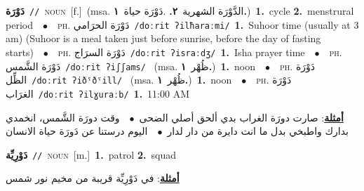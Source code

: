 \documentclass[10pt,a4paper,twoside]{article} %
\begin{document}
\begin{multicols}{2}
{\setlength\topsep{0pt}\textbf{\foreignlanguage{arabic}{دَوْرَة}}\ {\color{gray}\texttt{//}\color{black}}\ \textsc{noun}\ [f.]\ \color{gray}(msa. \foreignlanguage{arabic}{الدَّوْرَة الشهرية}~\foreignlanguage{arabic}{\textbf{٢.}}  .\foreignlanguage{arabic}{دَوْرَة حياة}~\foreignlanguage{arabic}{\textbf{١.}})\color{black}\ \textbf{1.}~cycle  \textbf{2.}~menstrural period\ \ $\bullet$\ \ \textsc{ph.} \color{gray} \foreignlanguage{arabic}{دَوْرَة الحرَامي}\color{black}\ {\color{gray}\texttt{/{\sffamily doːrit ʔilħaraːmi}/}\color{black}}\ \textbf{1.}~Suhoor time (usually at 3 am) (Suhoor is a meal taken just before sunrise, before the day of fasting starts)\ \ $\bullet$\ \ \textsc{ph.} \color{gray} \foreignlanguage{arabic}{دَوْرَة السرَاج}\color{black}\ {\color{gray}\texttt{/{\sffamily doːrit ʔisraːdʒ}/}\color{black}}\ \textbf{1.}~Isha prayer time\ \ $\bullet$\ \ \textsc{ph.} \color{gray} \foreignlanguage{arabic}{دَوْرَة الشَّمس}\color{black}\ {\color{gray}\texttt{/{\sffamily doːrit ʔiʃʃams}/}\color{black}}\ \color{gray} (msa. \foreignlanguage{arabic}{ظُهْر}~\foreignlanguage{arabic}{\textbf{١.}})\color{black}\ \textbf{1.}~noon\ \ $\bullet$\ \ \textsc{ph.} \color{gray} \foreignlanguage{arabic}{دَوْرَة الظِّل}\color{black}\ {\color{gray}\texttt{/{\sffamily doːrit ʔiðˤðˤill}/}\color{black}}\ \color{gray} (msa. \foreignlanguage{arabic}{ظُهْر}~\foreignlanguage{arabic}{\textbf{١.}})\color{black}\ \textbf{1.}~noon\ \ $\bullet$\ \ \textsc{ph.} \color{gray} \foreignlanguage{arabic}{دَوْرَة الغرَاب}\color{black}\ {\color{gray}\texttt{/{\sffamily doːrit ʔilɣuraːb}/}\color{black}}\ \textbf{1.}~11:00 AM\  \begin{flushright}\color{gray}\foreignlanguage{arabic}{\textbf{\underline{\foreignlanguage{arabic}{أمثلة}}}: صارت دورَة الغراب بدي ألحق أصلي الضحى\ $\bullet$\ \  وقت دورَة الشَّمس، انخمدي بدارك واطبخي بدل ما انت دايرة من دار لدار\ $\bullet$\ \  اليوم درستنا عن دَورَة حياة الانسان}\end{flushright}\color{black}} \vspace{2mm}

{\setlength\topsep{0pt}\textbf{\foreignlanguage{arabic}{دَوْرِيِّة}}\ {\color{gray}\texttt{//}\color{black}}\ \textsc{noun}\ [m.]\ \textbf{1.}~patrol  \textbf{2.}~squad\  \begin{flushright}\color{gray}\foreignlanguage{arabic}{\textbf{\underline{\foreignlanguage{arabic}{أمثلة}}}: في دَوْرِيِّة قريبة من مخيم نور شمس}\end{flushright}\color{black}} \vspace{2mm}


\end{multicols}
\end{document}
